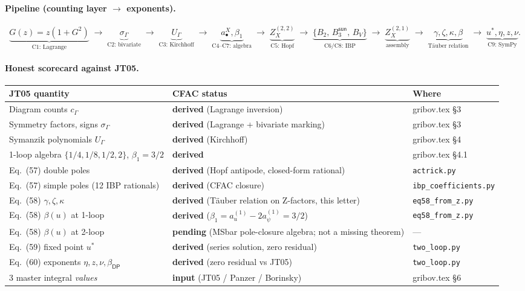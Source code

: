 \documentclass[11pt,a4paper]{article}
\begin{document}
\paragraph{Pipeline (counting layer $\to$ exponents).}
\[
\underbrace{G(z)=z(1{+}G^2)}_{\text{C1: Lagrange}}
\;\to\;
\underbrace{\sigma_\Gamma}_{\text{C2: bivariate}}
\;\to\;
\underbrace{U_\Gamma}_{\text{C3: Kirchhoff}}
\;\to\;
\underbrace{a^X_\bullet,\beta_1}_{\text{C4--C7: algebra}}
\;\to\;
\underbrace{Z^{(2,2)}_X}_{\text{C5: Hopf}}
\;\to\;
\underbrace{\{B_2,\,B_3^{\textsf{sun}},\,B_V\}}_{\text{C6/C8: IBP}}
\;\to\;
\underbrace{Z^{(2,1)}_X}_{\text{assembly}}
\;\to\;
\underbrace{\gamma,\zeta,\kappa,\beta}_{\text{T\"auber relation}}
\;\to\;
\underbrace{u^*,\eta,z,\nu}_{\text{C9: SymPy}}.
\]

\paragraph{Honest scorecard against JT05.}
\begin{center}\small
\begin{tabular}{@{}lll@{}}
\toprule
JT05 quantity & CFAC status & Where \\
\midrule
Diagram counts $c_\Gamma$              & \textbf{derived} (Lagrange inversion)        & gribov.tex §3 \\
Symmetry factors, signs $\sigma_\Gamma$ & \textbf{derived} (Lagrange + bivariate marking) & gribov.tex §3 \\
Symanzik polynomials $U_\Gamma$        & \textbf{derived} (Kirchhoff)                  & gribov.tex §4 \\
1-loop algebra $\{1/4,1/8,1/2,2\}$, $\beta_1=3/2$ & \textbf{derived}                & gribov.tex §4.1 \\
Eq.~(57) double poles                  & \textbf{derived} (Hopf antipode, closed-form rational) & \texttt{actrick.py} \\
Eq.~(57) simple poles (12 IBP rationals) & \textbf{derived} (CFAC closure)            & \texttt{ibp\_coefficients.py} \\
Eq.~(58) $\gamma, \zeta, \kappa$       & \textbf{derived} (T\"auber relation on Z-factors, this letter) & \texttt{eq58\_from\_z.py} \\
Eq.~(58) $\beta(u)$ at 1-loop          & \textbf{derived} ($\beta_1 = a_u^{(1)} - 2 a_\psi^{(1)} = 3/2$) & \texttt{eq58\_from\_z.py} \\
Eq.~(58) $\beta(u)$ at 2-loop          & \textbf{pending} (MSbar pole-closure algebra; not a missing theorem) & --- \\
Eq.~(59) fixed point $u^*$             & \textbf{derived} (series solution, zero residual) & \texttt{two\_loop.py} \\
Eq.~(60) exponents $\eta,z,\nu,\beta_{\textsf{DP}}$ & \textbf{derived} (zero residual vs JT05) & \texttt{two\_loop.py} \\
3 master integral \emph{values}        & \textbf{input} (JT05 / Panzer / Borinsky)     & gribov.tex §6 \\
\bottomrule
\end{tabular}
\end{center}
\end{document}
